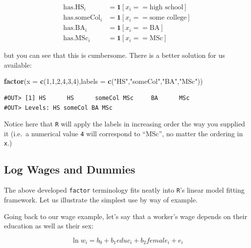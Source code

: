 \documentclass[]{book}
\newenvironment{Shaded}{\begin{snugshade}}{\end{snugshade}}
\newcommand{\KeywordTok}[1]{\textcolor[rgb]{0.13,0.29,0.53}{\textbf{#1}}}
\newcommand{\DataTypeTok}[1]{\textcolor[rgb]{0.13,0.29,0.53}{#1}}
\newcommand{\DecValTok}[1]{\textcolor[rgb]{0.00,0.00,0.81}{#1}}
\newcommand{\StringTok}[1]{\textcolor[rgb]{0.31,0.60,0.02}{#1}}
\newcommand{\NormalTok}[1]{#1}
\begin{document}
\begin{align*}
\text{has.HS}_i &= \mathbf{1}[x_i==\text{high school}] \\
\text{has.someCol}_i &= \mathbf{1}[x_i==\text{some college}] \\
\text{has.BA}_i &= \mathbf{1}[x_i==\text{BA}] \\
\text{has.MSc}_i &= \mathbf{1}[x_i==\text{MSc}] 
\end{align*}

but you can see that this is cumbersome. There is a better solution for
us available:

\begin{Shaded}
\begin{Highlighting}[]
\KeywordTok{factor}\NormalTok{(}\DataTypeTok{x =} \KeywordTok{c}\NormalTok{(}\DecValTok{1}\NormalTok{,}\DecValTok{1}\NormalTok{,}\DecValTok{2}\NormalTok{,}\DecValTok{4}\NormalTok{,}\DecValTok{3}\NormalTok{,}\DecValTok{4}\NormalTok{),}\DataTypeTok{labels =} \KeywordTok{c}\NormalTok{(}\StringTok{"HS"}\NormalTok{,}\StringTok{"someCol"}\NormalTok{,}\StringTok{"BA"}\NormalTok{,}\StringTok{"MSc"}\NormalTok{))}
\end{Highlighting}
\end{Shaded}

\begin{verbatim}
#OUT> [1] HS      HS      someCol MSc     BA      MSc    
#OUT> Levels: HS someCol BA MSc
\end{verbatim}

Notice here that \texttt{R} will apply the labels in increasing order
the way you supplied it (i.e.~a numerical value \texttt{4} will
correspond to ``MSc'', no matter the ordering in \texttt{x}.)

\subsection{Log Wages and Dummies}\label{factors}

The above developed \texttt{factor} terminology fits neatly into
\texttt{R}'s linear model fitting framework. Let us illustrate the
simplest use by way of example.

Going back to our wage example, let's say that a worker's wage depends
on their education as well as their sex:

\begin{equation}
\ln w_i = b_0 + b_1 educ_i + b_2 female_i + e_i \label{eq:wage-sex}
\end{equation}
\end{document}
